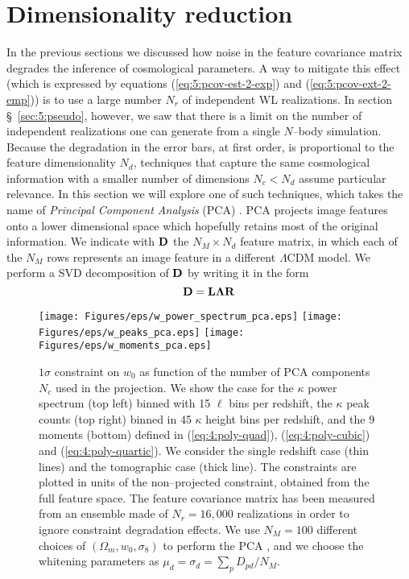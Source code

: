 \section{Dimensionality reduction}
\label{sec:5:dimred}
In the previous sections we discussed how noise in the feature covariance matrix degrades the inference of cosmological parameters. A way to mitigate this effect (which is expressed by equations (\ref{eq:5:pcov-est-2-exp}) and (\ref{eq:5:pcov-ext-2-emp})) is to use a large number $N_r$ of independent WL realizations. In section \S~\ref{sec:5:pseudo}, however, we saw that there is a limit on the number of independent realizations one can generate from a single $N$--body simulation. Because the degradation in the error bars, at first order, is proportional to the feature dimensionality $N_d$, techniques that capture the same cosmological information with a smaller number of dimensions $N_c<N_d$ assume particular relevance. In this section we will explore one of such techniques, which takes the name of \textit{Principal Component Analysis} (PCA) \citep{astroMLText}. PCA projects image features onto a lower dimensional space which hopefully retains most of the original information. We indicate with $\mathbf{D}$ the $N_M\times N_d$ feature matrix, in which each of the $N_M$ rows represents an image feature in a different $\Lambda$CDM model. We perform a SVD decomposition \citep{scipy,astroMLText} of $\mathbf{D}$ by writing it in the form
%  
\begin{equation}
\label{eq:5:svd}
\mathbf{D} = \mathbf{L\Lambda R}
\end{equation}
%
\begin{figure}
\begin{center}
\texttt{[image: Figures/eps/w\_power\_spectrum\_pca.eps]} \texttt{[image: Figures/eps/w\_peaks\_pca.eps]}
\texttt{[image: Figures/eps/w\_moments\_pca.eps]}
\end{center}
\caption{$1\sigma$ constraint on $w_0$ as function of the number of PCA components $N_c$ used in the projection. We show the case for the $\kappa$ power spectrum (top left) binned with 15 $\ell$ bins per redshift, the $\kappa$ peak counts (top right) binned in 45 $\kappa$ height bins per redshift, and the 9 moments (bottom) defined in (\ref{eq:4:poly-quad}), (\ref{eq:4:poly-cubic}) and (\ref{eq:4:poly-quartic}). We consider the single redshift case (thin lines) and the tomographic case (thick line). The constraints are plotted in units of the non--projected constraint, obtained from the full feature space. The feature covariance matrix has been measured from an ensemble made of $N_r=16,000$ realizations in order to ignore constraint degradation effects. We use $N_M=100$ different choices of $(\Omega_m,w_0,\sigma_8)$ to perform the PCA \citep{PetriPhotoZ}, and we choose the whitening parameters as $\mu_d=\sigma_d=\sum_p D_{pd}/N_M$.}
\label{fig:5:pca}
\end{figure}
